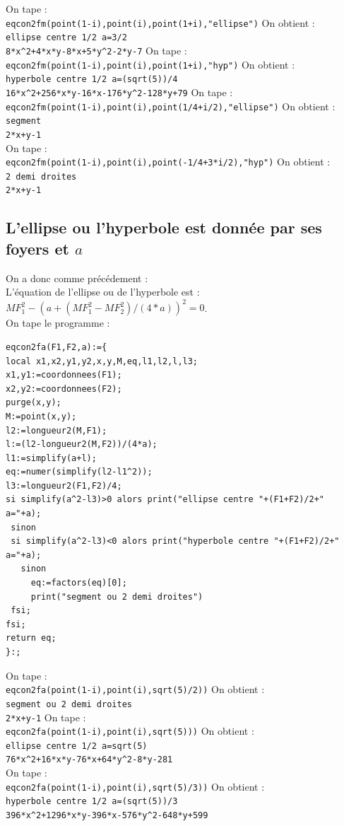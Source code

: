 \documentclass[a4paper,11pt]{book}
\begin{document}
On tape :\\
{\tt eqcon2fm(point(1-i),point(i),point(1+i),"ellipse")}
On obtient :\\
{\tt ellipse centre 1/2 a=3/2}\\
{\tt 8*x\verb|^|2+4*x*y-8*x+5*y\verb|^|2-2*y-7}
On tape :\\
{\tt eqcon2fm(point(1-i),point(i),point(1+i),"hyp")}
On obtient :\\
{\tt hyperbole centre 1/2 a=(sqrt(5))/4}\\
{\tt 16*x\verb|^|2+256*x*y-16*x-176*y\verb|^|2-128*y+79}
On tape :\\
{\tt eqcon2fm(point(1-i),point(i),point(1/4+i/2),"ellipse")}
On obtient :\\
{\tt segment}\\
{\tt 2*x+y-1}\\
On tape :\\
{\tt eqcon2fm(point(1-i),point(i),point(-1/4+3*i/2),"hyp")}
On obtient :\\
{\tt 2 demi droites}\\
{\tt 2*x+y-1}

\subsection{L'ellipse ou l'hyperbole est donn\'ee par ses foyers et $a$}
On a donc comme pr\'ec\'edement :\\
L'\'equation de l'ellipse ou de l'hyperbole est :
$MF_1^2-(a+(MF_1^2-MF_2^2)/(4*a))^2=0$.\\
On tape le programme :\\
\begin{verbatim}
eqcon2fa(F1,F2,a):={
local x1,x2,y1,y2,x,y,M,eq,l1,l2,l,l3;
x1,y1:=coordonnees(F1);
x2,y2:=coordonnees(F2);
purge(x,y);
M:=point(x,y);
l2:=longueur2(M,F1);
l:=(l2-longueur2(M,F2))/(4*a);
l1:=simplify(a+l);
eq:=numer(simplify(l2-l1^2));
l3:=longueur2(F1,F2)/4;
si simplify(a^2-l3)>0 alors print("ellipse centre "+(F1+F2)/2+" a="+a);
 sinon 
 si simplify(a^2-l3)<0 alors print("hyperbole centre "+(F1+F2)/2+" a="+a); 
   sinon
     eq:=factors(eq)[0];
     print("segment ou 2 demi droites") 
 fsi;
fsi;
return eq;
}:;
\end{verbatim}
On tape :\\
{\tt eqcon2fa(point(1-i),point(i),sqrt(5)/2))}
On obtient :\\
{\tt segment ou 2 demi droites}\\
{\tt 2*x+y-1}
On tape :\\
{\tt eqcon2fa(point(1-i),point(i),sqrt(5)))}
On obtient :\\
{\tt ellipse centre 1/2 a=sqrt(5)}\\
{\tt 76*x\verb|^|2+16*x*y-76*x+64*y\verb|^|2-8*y-281}\\
On tape :\\
{\tt eqcon2fa(point(1-i),point(i),sqrt(5)/3))}
On obtient :\\
{\tt hyperbole centre 1/2 a=(sqrt(5))/3}\\
{\tt 396*x\verb|^|2+1296*x*y-396*x-576*y\verb|^|2-648*y+599}
\end{document}
